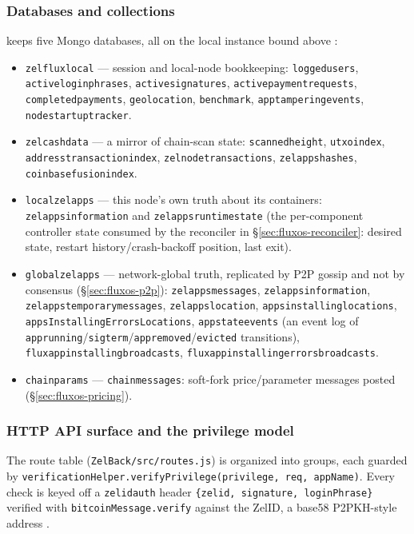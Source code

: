 \subsubsection{Databases and collections}
\FluxOS keeps five Mongo databases, all on the local instance bound above
:
\begin{itemize}
\item \texttt{zelfluxlocal} — session and local-node bookkeeping: \texttt{loggedusers},
  \texttt{activeloginphrases}, \texttt{activesignatures}, \texttt{activepaymentrequests},
  \texttt{completedpayments}, \texttt{geolocation}, \texttt{benchmark}, \texttt{apptamperingevents},
  \texttt{nodestartuptracker}.
\item \texttt{zelcashdata} — a mirror of \fluxd chain-scan state: \texttt{scannedheight},
  \texttt{utxoindex}, \texttt{addresstransactionindex}, \texttt{zelnodetransactions},
  \texttt{zelappshashes}, \texttt{coinbasefusionindex}.
\item \texttt{localzelapps} — this node's own truth about its containers:
  \texttt{zelappsinformation} and \texttt{zelappsruntimestate} (the per-component controller state
  consumed by the reconciler in \S\ref{sec:fluxos-reconciler}: desired state, restart
  history/crash-backoff position, last exit).
\item \texttt{globalzelapps} — network-global truth, replicated by P2P gossip and not by consensus
  (\S\ref{sec:fluxos-p2p}): \texttt{zelappsmessages}, \texttt{zelappsinformation},
  \texttt{zelappstemporarymessages}, \texttt{zelappslocation}, \texttt{appsinstallinglocations},
  \texttt{apps\allowbreak{}Installing\allowbreak{}Errors\allowbreak{}Locations}, \texttt{appstateevents} (an event log of
  \texttt{apprunning}\slash\texttt{sigterm}\slash\texttt{appremoved}\slash\texttt{evicted} transitions),
  \texttt{fluxappinstallingbroadcasts}, \texttt{fluxappinstallingerrorsbroadcasts}.
\item \texttt{chainparams} — \texttt{chainmessages}: soft-fork price/parameter messages posted
   (\S\ref{sec:fluxos-pricing}).
\end{itemize}

\subsubsection{HTTP API surface and the privilege model}
The route table (\texttt{ZelBack/\allowbreak{}src/\allowbreak{}routes.\allowbreak{}js}) is organized into groups, each guarded by
\texttt{verificationHelper.\allowbreak{}verifyPrivilege(privilege, req, appName)}. Every check is keyed off a
\texttt{zelidauth} header \texttt{\{zelid,\allowbreak{} signature,\allowbreak{} loginPhrase\}} verified with
\texttt{bitcoinMessage.\allowbreak{}verify} against the ZelID, a base58 P2PKH-style address
.

